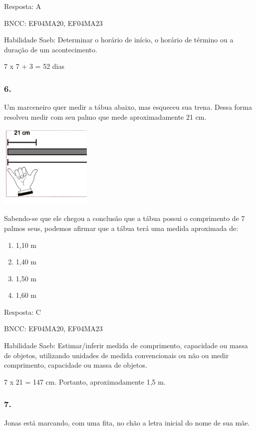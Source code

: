 Resposta: A

BNCC: EF04MA20, EF04MA23

Habilidade Saeb: Determinar o horário de início, o horário de término ou
a duração de um acontecimento.

7 x 7 + 3 = 52 dias

\subsubsection{6.}\label{section-162}

Um marceneiro quer medir a tábua abaixo, mas esqueceu sua trena. Dessa
forma resolveu medir com seu palmo que mede aproximadamente 21 cm.

\includegraphics[width=1.73077in,height=1.57654in]{media/image154.png}

Sabendo-se que ele chegou a conclusão que a tábua possui o comprimento
de 7 palmos seus, podemos afirmar que a tábua terá uma medida aproximada
de:

\begin{enumerate}
\def\labelenumi{\alph{enumi})}
\item
  1,10 m
\item
  1,40 m
\item
  1,50 m
\item
  1,60 m
\end{enumerate}

Resposta: C

BNCC: EF04MA20, EF04MA23

Habilidade Saeb: Estimar/inferir medida de comprimento, capacidade ou
massa de objetos, utilizando unidades de medida convencionais ou não ou
medir comprimento, capacidade ou massa de objetos.

7 x 21 = 147 cm. Portanto, aproximadamente 1,5 m.

\subsubsection{7.}\label{section-163}

Jonas está marcando, com uma fita, no chão a letra inicial do nome de
sua mãe.


